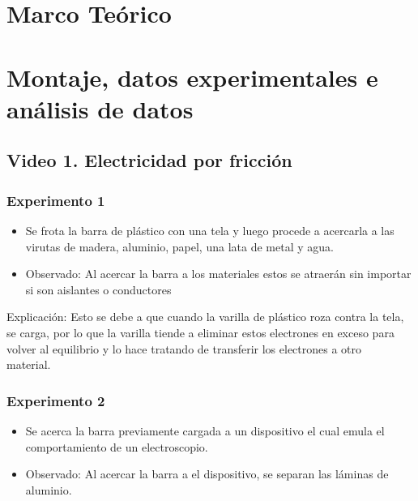 \documentclass[letterpaper, 12pt]{report}
\begin{document}
\section{Marco Teórico}

\section{Montaje, datos experimentales e análisis de datos}

\subsection{Video 1. Electricidad por fricción}

\subsubsection{Experimento 1}

\begin{itemize}
	\item Se frota la barra de plástico con una tela y luego procede a
	      acercarla a las  virutas de madera, aluminio, papel, una lata de
	      metal y agua.

	\item Observado: Al acercar la barra a los materiales estos se atraerán
	      sin importar si son aislantes o conductores
\end{itemize}

Explicación: Esto se debe a que cuando la varilla de plástico roza contra la
tela, se carga, por lo que la varilla tiende a eliminar estos electrones en
exceso para volver al equilibrio y lo hace tratando de transferir los
electrones  a otro material.~\cite{GenerarCargaElectrica}

\subsubsection{Experimento 2}

\begin{itemize}
	\item Se acerca la barra previamente cargada a un dispositivo el cual
	      emula el comportamiento de un electroscopio.

	\item Observado: Al acercar la barra a el dispositivo, se separan las
	      láminas de aluminio.
\end{itemize}
\end{document}
